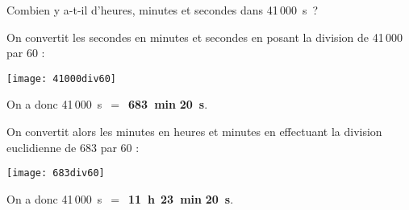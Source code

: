 

\begin{methode*1}

\begin{exemple*1}
Combien y a-t-il d'heures, minutes et secondes dans 41\,000 s ? \\[1em]
\begin{minipage}[t]{.46\textwidth}
On convertit les secondes en minutes et secondes en posant la division de 41\,000 par 60 :

\begin{center}\texttt{[image: 41000div60]} \end{center}

On a donc 41\,000 s $=$ \textcolor{rose}{\textbf{683 min}} \textcolor{vert}{\textbf{20 s}}.
\end{minipage}\hfill%
\begin{minipage}[t]{.46\textwidth}
On convertit alors les minutes en heures et minutes en effectuant la division euclidienne de 683 par 60 :

\begin{center}\texttt{[image: 683div60]} \end{center}
On a donc 41\,000 s $=$ \textcolor{bleu}{\textbf{11 h}} \textcolor{rose}{\textbf{23 min}} \textcolor{vert}{\textbf{20 s}}.
\end{minipage}


\end{exemple*1}

\exercice

\end{methode*1}


